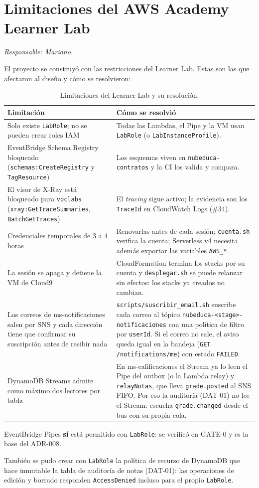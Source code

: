 \section{Limitaciones del AWS Academy Learner Lab}
\label{sec:limitaciones}
\textit{Responsable: Mariano.}

El proyecto se construyó con las restricciones del Learner Lab. Estas son las que afectaron al diseño
y cómo se resolvieron:

\begin{table}[htbp]
\centering\small
\begin{tabularx}{\textwidth}{p{}X}
\toprule
Limitación & Cómo se resolvió \\
\midrule
Solo existe \texttt{LabRole}; no se pueden crear roles IAM & Todas las Lambdas, el Pipe y la VM usan \texttt{LabRole} (o \texttt{LabInstanceProfile}). \\
EventBridge Schema Registry bloqueado (\texttt{schemas:CreateRegistry} y \texttt{TagResource}) & Los esquemas viven en \texttt{nubeduca-contratos} y la CI los valida y compara. \\
El visor de X-Ray está bloqueado para \texttt{voclabs} (\texttt{xray:GetTraceSummaries}, \texttt{BatchGetTraces}) & El \textit{tracing} sigue activo; la evidencia son los \texttt{TraceId} en CloudWatch Logs (\#34). \\
Credenciales temporales de 3 a 4 horas & Renovarlas antes de cada sesión; \texttt{cuenta.sh} verifica la cuenta; Serverless v4 necesita además exportar las variables \texttt{AWS\_*}. \\
La sesión se apaga y detiene la VM de Cloud9 & CloudFormation termina los stacks por su cuenta y \texttt{desplegar.sh} se puede relanzar sin efectos: los stacks ya creados no cambian. \\
Los correos de ms-notificaciones salen por SNS y cada dirección tiene que confirmar su suscripción antes de recibir nada & \texttt{scripts/suscribir\_email.sh} suscribe cada correo al tópico \texttt{nubeduca-<stage>-notificaciones} con una política de filtro por \texttt{userId}. Si el correo no sale, el aviso queda igual en la bandeja (\texttt{GET /notifications/me}) con estado \texttt{FAILED}. \\
DynamoDB Streams admite como máximo dos lectores por tabla & En ms-calificaciones el Stream ya lo leen el Pipe del outbox (o la Lambda relay) y \texttt{relayNotas}, que lleva \texttt{grade.posted} al SNS FIFO. Por eso la auditoría (DAT-01) no lee el Stream: escucha \texttt{grade.changed} desde el bus con su propia cola. \\
\bottomrule
\end{tabularx}
\caption{Limitaciones del Learner Lab y su resolución.}
\label{tab:limitaciones}
\end{table}

EventBridge Pipes \textbf{sí} está permitido con \texttt{LabRole}: se verificó en GATE-0 y es la base
del ADR-008.

También se pudo crear con \texttt{LabRole} la política de recurso de DynamoDB que hace inmutable la
tabla de auditoría de notas (DAT-01): las operaciones de edición y borrado responden
\texttt{AccessDenied} incluso para el propio \texttt{LabRole}.
